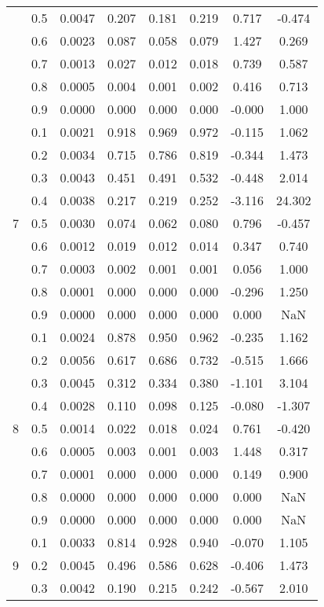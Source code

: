 \documentclass[11pt,a4paper]{report}
\begin{document}
\begin{longtable}{ | c | c || c | c | c | c | c | c | }
 & 0.5 & 0.0047 & 0.207 & 0.181 & 0.219 & 0.717 & -0.474 \\
 & 0.6 & 0.0023 & 0.087 & 0.058 & 0.079 & 1.427 & 0.269 \\
 & 0.7 & 0.0013 & 0.027 & 0.012 & 0.018 & 0.739 & 0.587 \\
 & 0.8 & 0.0005 & 0.004 & 0.001 & 0.002 & 0.416 & 0.713 \\
 & 0.9 & 0.0000 & 0.000 & 0.000 & 0.000 & -0.000 & 1.000 \\
 \hline
\multirow{9}{*}{7} & 0.1 & 0.0021 & 0.918 & 0.969 & 0.972 & -0.115 & 1.062 \\
 & 0.2 & 0.0034 & 0.715 & 0.786 & 0.819 & -0.344 & 1.473 \\
 & 0.3 & 0.0043 & 0.451 & 0.491 & 0.532 & -0.448 & 2.014 \\
 & 0.4 & 0.0038 & 0.217 & 0.219 & 0.252 & -3.116 & 24.302 \\
 & 0.5 & 0.0030 & 0.074 & 0.062 & 0.080 & 0.796 & -0.457 \\
 & 0.6 & 0.0012 & 0.019 & 0.012 & 0.014 & 0.347 & 0.740 \\
 & 0.7 & 0.0003 & 0.002 & 0.001 & 0.001 & 0.056 & 1.000 \\
 & 0.8 & 0.0001 & 0.000 & 0.000 & 0.000 & -0.296 & 1.250 \\
 & 0.9 & 0.0000 & 0.000 & 0.000 & 0.000 & 0.000 & NaN \\
 \hline
\multirow{9}{*}{8} & 0.1 & 0.0024 & 0.878 & 0.950 & 0.962 & -0.235 & 1.162 \\
 & 0.2 & 0.0056 & 0.617 & 0.686 & 0.732 & -0.515 & 1.666 \\
 & 0.3 & 0.0045 & 0.312 & 0.334 & 0.380 & -1.101 & 3.104 \\
 & 0.4 & 0.0028 & 0.110 & 0.098 & 0.125 & -0.080 & -1.307 \\
 & 0.5 & 0.0014 & 0.022 & 0.018 & 0.024 & 0.761 & -0.420 \\
 & 0.6 & 0.0005 & 0.003 & 0.001 & 0.003 & 1.448 & 0.317 \\
 & 0.7 & 0.0001 & 0.000 & 0.000 & 0.000 & 0.149 & 0.900 \\
 & 0.8 & 0.0000 & 0.000 & 0.000 & 0.000 & 0.000 & NaN \\
 & 0.9 & 0.0000 & 0.000 & 0.000 & 0.000 & 0.000 & NaN \\
 \hline
\multirow{9}{*}{9} & 0.1 & 0.0033 & 0.814 & 0.928 & 0.940 & -0.070 & 1.105 \\
 & 0.2 & 0.0045 & 0.496 & 0.586 & 0.628 & -0.406 & 1.473 \\
 & 0.3 & 0.0042 & 0.190 & 0.215 & 0.242 & -0.567 & 2.010 \\

\end{longtable}
\end{document}
